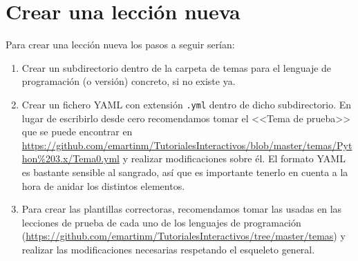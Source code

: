 \documentclass[]{article}
\newcommand{\code}[1]{{\lstinline[basicstyle=\ttfamily,mathescape]!#1!}}
\begin{document}
\section{Crear una lección nueva}
Para crear una lección nueva los pasos a seguir serían:
\begin{enumerate}
	\item Crear un subdirectorio dentro de la carpeta de temas para el lenguaje de programación (o versión) concreto, si no existe ya.
	\item Crear un fichero YAML con extensión \code{.yml} dentro de dicho subdirectorio. En lugar de escribirlo desde cero recomendamos tomar el <<Tema de prueba>> que se puede encontrar en \url{https://github.com/emartinm/TutorialesInteractivos/blob/master/temas/Python%203.x/Tema0.yml} y realizar modificaciones sobre él. El formato YAML es bastante sensible al sangrado, así que es importante tenerlo en cuenta a la hora de anidar los distintos elementos.
	\item Para crear las plantillas correctoras, recomendamos tomar las usadas en las lecciones de prueba de cada uno de los lenguajes de programación (\url{https://github.com/emartinm/TutorialesInteractivos/tree/master/temas}) y realizar las modificaciones necesarias respetando el esqueleto general.
\end{enumerate}
\end{document}
